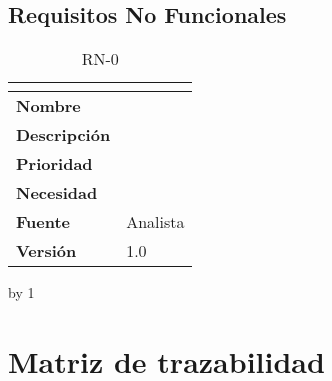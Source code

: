 \subsection{Requisitos No Funcionales}
\newcount\rn
{}
\begin{table}[H]
	\caption{RN-0\number\rn}
	\begin{tabular}{|l|l|}
		\hline
		\multicolumn{2}{|c|}{\cellcolor[HTML]{BFBFBF}{\color[HTML]{000000} \textbf{RN-0\number\rn}}} \\ \hline
		\textbf{Nombre}      &          \\ \hline
		\textbf{Descripción} &          \\ \hline
		\textbf{Prioridad}   &          \\ \hline
		\textbf{Necesidad}   &          \\ \hline
		\textbf{Fuente}      & Analista \\ \hline
		\textbf{Versión}     & 1.0      \\ \hline
	\end{tabular}
\end{table}
\advance\rn by 1


\section{Matriz de trazabilidad}